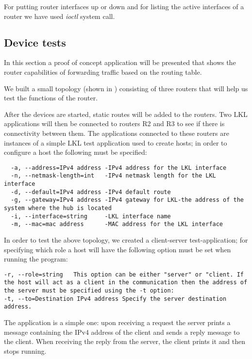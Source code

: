 {{%
For putting router interfaces up or down and for listing the active interfaces of a router we have used \textit{ioctl} system call.

\subsection{Device tests}
\label{sub-sec:router-tests}

In this section a proof of concept application will be presented that shows the router capabilities of forwarding traffic based on the routing table. 

We built a small topology (shown in ) consisting of three routers that will help us test the functions of the router.

After the devices are started, static routes will be added to the routers. Two LKL applications will then be connected to routers R2 and R3 to see if there is connectivity between them. The applications connected to these routers are instances of a simple LKL test application used to create hosts; in order to configure a host the following must be specified: 
\begin{lstlisting}
  -a, --address=IPv4 address -IPv4 address for the LKL interface
  -n, --netmask-length=int   -IPv4 netmask length for the LKL interface
  -d, --default=IPv4 address -IPv4 default route
  -g, --gateway=IPv4 address -IPv4 gateway for LKL-the address of the system where the hub is located
  -i, --interface=string     -LKL interface name
  -m, --mac=mac address      -MAC address for the LKL interface
\end{lstlisting}

\begin{comment}
  -l, --lkl                  -means that this application uses LKL
  -p, --port=int             Port
  -r, --role=string          server/client
  -t, --to=Destination IPv4 address
                             IPv4 destination
\end{comment}
In order to test the above topology, we created a client-server test-application; for specifying which role a host will have the following option must be set when running the program:
\begin{lstlisting}
-r, --role=string   This option can be either "server" or "client. If the host will act as a client in the communication then the address of the server must be specified using the -t option:
-t, --to=Destination IPv4 address Specify the server destination address.
\end{lstlisting} 
The application is a simple one: upon receiving a request the server prints a message containing the IPv4 address of the client and sends a reply message to the client. When receiving the reply from the server, the client prints it and then stops running.

}}
